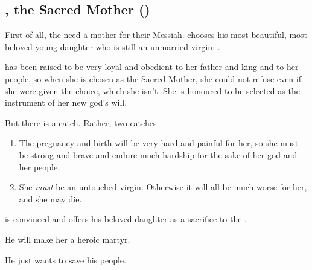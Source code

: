 \subsection{\Ilu, the Sacred Mother ()}
First of all, the \banes{} need a mother for their Messiah. \Semiza{} chooses his most beautiful, most beloved young daughter who is still an unmarried virgin: . 

\Ilu{} has been raised to be very loyal and obedient to her father and king and to her people, so when she is chosen as the Sacred Mother, she could not refuse even if she were given the choice, which she isn't. She is honoured to be selected as the instrument of her new god's will. 

But there is a catch. Rather, two catches. 

\begin{enumerate}
  \item 
    The pregnancy and birth will be very hard and painful for her, so she must be strong and brave and endure much hardship for the sake of her god and her people.
  \item
    She \emph{must} be an untouched virgin. Otherwise it will all be much worse for her, and she may die.
\end{enumerate}

\Semiza{} is convinced and offers his beloved daughter as a sacrifice to the \banes. 


He will make her a heroic martyr. 


He just wants to save his people. 


